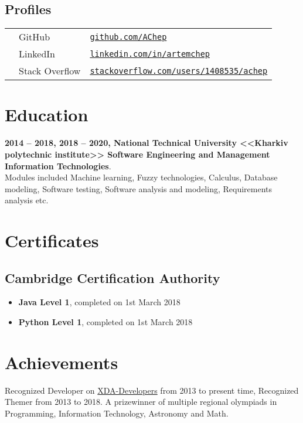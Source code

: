 \documentclass[a4paper]{article}
\begin{document}
	\subsection*{Profiles}
	\begin{tabular}{@{}lll}
		\faGithub & GitHub & \href{https://github.com/AChep}{\texttt{github.com/AChep}} \\
		\faLinkedin & LinkedIn & \href{https://www.linkedin.com/in/artemchep/}{\texttt{linkedin.com/in/artemchep}} \\
		\faStackOverflow & Stack Overflow & \href{https://stackoverflow.com/users/1408535/achep}{\texttt{stackoverflow.com/users/1408535/achep}} \\
	\end{tabular}

	\section*{Education}
	\textbf{2014 -- 2018, 2018 -- 2020, National Technical University <<Kharkiv polytechnic institute>> Software Engineering and Management Information Technologies}. \\
	Modules included Machine learning, Fuzzy technologies, Calculus, Database modeling, Software testing, Software analysis and modeling, Requirements analysis etc.
	
	\section*{Certificates}
	\subsection*{Cambridge Certification Authority}
	\begin{itemize}
		\item \textbf{Java Level 1}, completed on 1st March 2018
		\item \textbf{Python Level 1}, completed on 1st March 2018
	\end{itemize}

	\section*{Achievements}
	Recognized Developer on \href{https://forum.xda-developers.com/member.php?u=3685328}{XDA-Developers} from 2013 to present time, Recognized Themer from 2013 to 2018.
	A prizewinner of multiple regional olympiads in Programming, Information Technology, Astronomy and Math.
\end{document}
